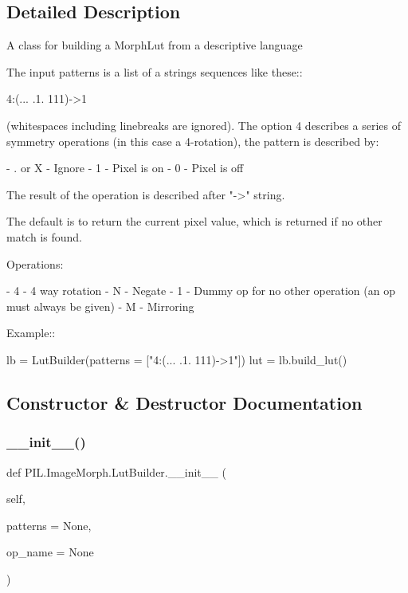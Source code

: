 \subsection{Detailed Description}
\begin{DoxyVerb}A class for building a MorphLut from a descriptive language

The input patterns is a list of a strings sequences like these::

    4:(...
       .1.
       111)->1

(whitespaces including linebreaks are ignored). The option 4
describes a series of symmetry operations (in this case a
4-rotation), the pattern is described by:

- . or X - Ignore
- 1 - Pixel is on
- 0 - Pixel is off

The result of the operation is described after "->" string.

The default is to return the current pixel value, which is
returned if no other match is found.

Operations:

- 4 - 4 way rotation
- N - Negate
- 1 - Dummy op for no other operation (an op must always be given)
- M - Mirroring

Example::

    lb = LutBuilder(patterns = ["4:(... .1. 111)->1"])
    lut = lb.build_lut()\end{DoxyVerb}
 

\subsection{Constructor \& Destructor Documentation}
\mbox{\label{classPIL_1_1ImageMorph_1_1LutBuilder_a98a5667d375bddc23ab5996f5d39efd5}} 
\subsubsection{\texorpdfstring{\+\_\+\+\_\+init\+\_\+\+\_\+()}{\_\_init\_\_()}}
{\footnotesize\ttfamily def P\+I\+L.\+Image\+Morph.\+Lut\+Builder.\+\_\+\+\_\+init\+\_\+\+\_\+ (\begin{DoxyParamCaption}\item[{}]{self,  }\item[{}]{patterns = {\ttfamily None},  }\item[{}]{op\+\_\+name = {\ttfamily None} }\end{DoxyParamCaption})}




